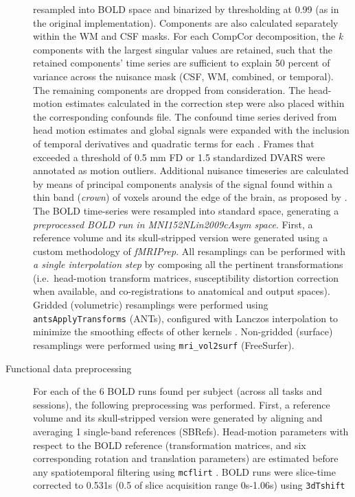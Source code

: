 \documentclass[
]{article}
\begin{document}
\begin{description}
resampled into BOLD space and binarized by thresholding at 0.99 (as in
the original implementation). Components are also calculated separately
within the WM and CSF masks. For each CompCor decomposition, the
\emph{k} components with the largest singular values are retained, such
that the retained components' time series are sufficient to explain 50
percent of variance across the nuisance mask (CSF, WM, combined, or
temporal). The remaining components are dropped from consideration. The
head-motion estimates calculated in the correction step were also placed
within the corresponding confounds file. The confound time series
derived from head motion estimates and global signals were expanded with
the inclusion of temporal derivatives and quadratic terms for each
\citep{confounds_satterthwaite_2013}. Frames that exceeded a threshold
of 0.5 mm FD or 1.5 standardized DVARS were annotated as motion
outliers. Additional nuisance timeseries are calculated by means of
principal components analysis of the signal found within a thin band
(\emph{crown}) of voxels around the edge of the brain, as proposed by
\citep{patriat_improved_2017}. The BOLD time-series were resampled into
standard space, generating a \emph{preprocessed BOLD run in
MNI152NLin2009cAsym space}. First, a reference volume and its
skull-stripped version were generated using a custom methodology of
\emph{fMRIPrep}. All resamplings can be performed with \emph{a single
interpolation step} by composing all the pertinent transformations
(i.e.~head-motion transform matrices, susceptibility distortion
correction when available, and co-registrations to anatomical and output
spaces). Gridded (volumetric) resamplings were performed using
\texttt{antsApplyTransforms} (ANTs), configured with Lanczos
interpolation to minimize the smoothing effects of other kernels
\citep{lanczos}. Non-gridded (surface) resamplings were performed using
\texttt{mri\_vol2surf} (FreeSurfer).
\item[Functional data preprocessing]
For each of the 6 BOLD runs found per subject (across all tasks and
sessions), the following preprocessing was performed. First, a reference
volume and its skull-stripped version were generated by aligning and
averaging 1 single-band references (SBRefs). Head-motion parameters with
respect to the BOLD reference (transformation matrices, and six
corresponding rotation and translation parameters) are estimated before
any spatiotemporal filtering using \texttt{mcflirt} \citep[FSL
6.0.5.1:57b01774,][]{mcflirt}. BOLD runs were slice-time corrected to
0.531s (0.5 of slice acquisition range 0s-1.06s) using \texttt{3dTshift}

\end{description}
\end{document}
